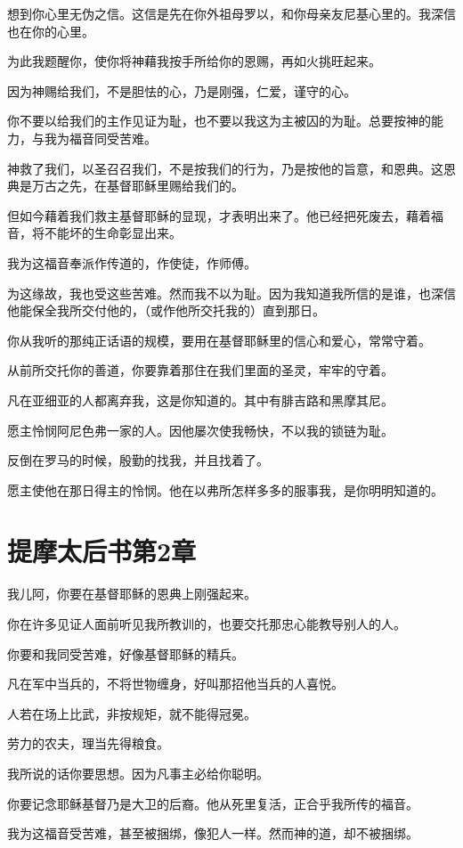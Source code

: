 \documentclass[12pt,oneside]{book}
\begin{document}
想到你心里无伪之信。这信是先在你外祖母罗以，和你母亲友尼基心里的。我深信也在你的心里。

为此我题醒你，使你将神藉我按手所给你的恩赐，再如火挑旺起来。

因为神赐给我们，不是胆怯的心，乃是刚强，仁爱，谨守的心。

你不要以给我们的主作见证为耻，也不要以我这为主被囚的为耻。总要按神的能力，与我为福音同受苦难。

神救了我们，以圣召召我们，不是按我们的行为，乃是按他的旨意，和恩典。这恩典是万古之先，在基督耶稣里赐给我们的。

但如今藉着我们救主基督耶稣的显现，才表明出来了。他已经把死废去，藉着福音，将不能坏的生命彰显出来。

我为这福音奉派作传道的，作使徒，作师傅。

为这缘故，我也受这些苦难。然而我不以为耻。因为我知道我所信的是谁，也深信他能保全我所交付他的，（或作他所交托我的）直到那日。

你从我听的那纯正话语的规模，要用在基督耶稣里的信心和爱心，常常守着。

从前所交托你的善道，你要靠着那住在我们里面的圣灵，牢牢的守着。

凡在亚细亚的人都离弃我，这是你知道的。其中有腓吉路和黑摩其尼。

愿主怜悯阿尼色弗一家的人。因他屡次使我畅快，不以我的锁链为耻。

反倒在罗马的时候，殷勤的找我，并且找着了。

愿主使他在那日得主的怜悯。他在以弗所怎样多多的服事我，是你明明知道的。

\chapter{提摩太后书第2章}
我儿阿，你要在基督耶稣的恩典上刚强起来。

你在许多见证人面前听见我所教训的，也要交托那忠心能教导别人的人。

你要和我同受苦难，好像基督耶稣的精兵。

凡在军中当兵的，不将世物缠身，好叫那招他当兵的人喜悦。

人若在场上比武，非按规矩，就不能得冠冕。

劳力的农夫，理当先得粮食。

我所说的话你要思想。因为凡事主必给你聪明。

你要记念耶稣基督乃是大卫的后裔。他从死里复活，正合乎我所传的福音。

我为这福音受苦难，甚至被捆绑，像犯人一样。然而神的道，却不被捆绑。
\end{document}
